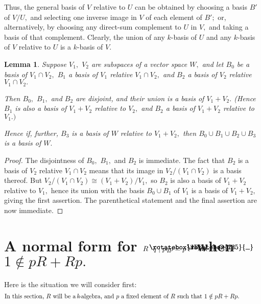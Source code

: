 \documentclass{amsart}
\newtheorem{lemma}[theorem]{Lemma}
\DeclareRobustCommand{\lang}{\begin{picture}(5,7)
\put(1.2,2.5){\rotatebox{45}{\line(1,0){6.0}}}
\put(1.2,2.5){\rotatebox{315}{\line(1,0){6.0}}}
\end{picture}\kern.16em}
\DeclareRobustCommand{\rang}{\kern.1em\begin{picture}(5,7)
\put(.1,2.5){\rotatebox{135}{\line(1,0){6.0}}}
\put(.1,2.5){\rotatebox{225}{\line(1,0){6.0}}}
\end{picture}}
\begin{document}
Thus, the general basis of $V$ relative to $U$ can
be obtained by choosing a basis $B'$ of $V/U,$ and selecting
one inverse image in $V$ of each element of $B';$
or, alternatively, by choosing any direct-sum complement
to $U$ in $V,$ and taking a basis of that complement.
Clearly, the union of any $\!k\!$-basis of $U$ and any
$\!k\!$-basis of $V$ relative to $U$ is a $\!k\!$-basis of $V.$

\begin{lemma}\label{L.V_1+V_2}
Suppose $V_1,$ $V_2$ are subspaces of a vector space $W,$
and let $B_0$ be a basis of $V_1\cap V_2,$
$B_1$ a basis of $V_1$ relative $V_1\cap V_2,$ and
$B_2$ a basis of $V_2$ relative $V_1\cap V_2.$

Then $B_0,$ $B_1,$ and $B_2$ are disjoint, and their union
is a basis of $V_1+V_2.$
\textup{(}Hence $B_1$ is also a basis of $V_1+V_2$ relative
to $V_2,$ and $B_2$ a basis of $V_1+V_2$ relative to $V_1.)$

Hence if, further, $B_3$ is a basis of $W$ relative
to $V_1+V_2,$ then $B_0\cup B_1\cup B_2\cup B_3$ is
a basis of $W.$
\end{lemma}

\begin{proof}
The disjointness of $B_0,$ $B_1,$ and $B_2$ is immediate.
The fact that $B_2$ is a basis of $V_2$ relative $V_1\cap V_2$
means that its image in $V_2/(V_1\cap V_2)$ is a basis thereof.
But $V_2/(V_1\cap V_2)\cong (V_1+V_2)/V_1,$ so $B_2$ is also
a basis of $V_1+V_2$ relative to $V_1,$ hence its union with
the basis $B_0\cup B_1$ of $V_1$ is a basis of $V_1+V_2,$
giving the first assertion.
The parenthetical statement and the final assertion are now immediate.
\end{proof}

\section{A normal form for $R\lang q\mid pqp=p\rang$ when $1\notin pR+Rp.$}\label{S.norm}

Here is the situation we will consider first:
\vspace{.4em}
\begin{equation}\begin{minipage}[c]{35pc}\label{d.1_notin_Rp+pR}
In this section, $R$ will be a $\!k\!$-algebra,
and $p$ a fixed element of $R$ such that $1\notin pR+Rp.$
\end{minipage}\end{equation}
\end{document}
